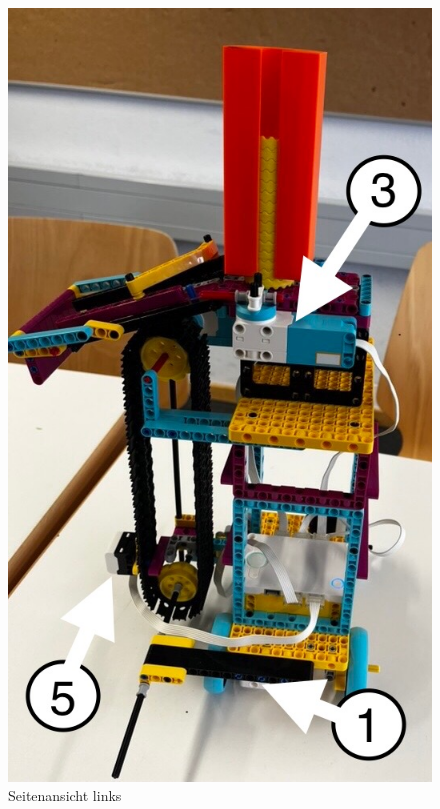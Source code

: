 \begin{figure}[H]
	\centering
	\begin{minipage}[b]{0.39\linewidth}
		\centering
		\includegraphics[width=\linewidth]{images/188CF006-D571-4F2D-9337-8C4BDD7DAAEF_1_105_c}
		\caption{Seitenansicht links}
		\label{fig:seitenansicht-links}
	\end{minipage}
	\hfill
	\begin{minipage}[b]{0.39\linewidth}

\end{minipage}
\end{figure}
